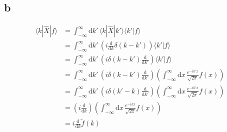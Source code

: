 \documentclass[letter]{article}
\begin{document}
\subsection*{b}
\begin{align*}
	\langle k | \hat{X} | f \rangle &= \int_{-\infty}^{\infty} \mathrm{d} k' \,  
\langle k | \hat{X} | k'\rangle \langle k' | f \rangle 
	\\
	 &= \int_{-\infty}^{\infty} \mathrm{d} k' \,  
	\left(
i \frac{\mathrm{d} }{\mathrm{d} k} \delta(k - k')
	\right)
\langle k' | f \rangle 
	\\
	 &= \int_{-\infty}^{\infty} \mathrm{d} k' \,  
	\left(
i \delta(k-k')\frac{\mathrm{d} }{\mathrm{d} k'}
	\right)
\langle k' | f \rangle 
	\\
	 &= \int_{-\infty}^{\infty} \mathrm{d} k' \,  
	\left(
i \delta(k-k')\frac{\mathrm{d} }{\mathrm{d} k'}
	\right)
	\left(
\int_{-\infty}^{\infty} \mathrm{d} x \, 
\frac{e^{ - i k' x}}{\sqrt{2 \pi } } f(x)
	\right)
	\\
	 &= \int_{-\infty}^{\infty} \mathrm{d} k' \,  
	\left(
i \delta(k'-k)\frac{\mathrm{d} }{\mathrm{d} k'}
	\right)
	\left(
\int_{-\infty}^{\infty} \mathrm{d} x \, 
\frac{e^{ - i k' x}}{\sqrt{2 \pi } } f(x)
	\right)
	\\
	 &=   
	\left(
i\frac{\mathrm{d} }{\mathrm{d} k}
	\right)
	\left(
\int_{-\infty}^{\infty} \mathrm{d} x \, 
\frac{e^{ - i k x}}{\sqrt{2 \pi } } f(x)
	\right)
	\\ 
	&= 
	i \frac{\mathrm{d} }{\mathrm{d} k } \tilde{f}(k)
	\\
\end{align*}
\end{document}
